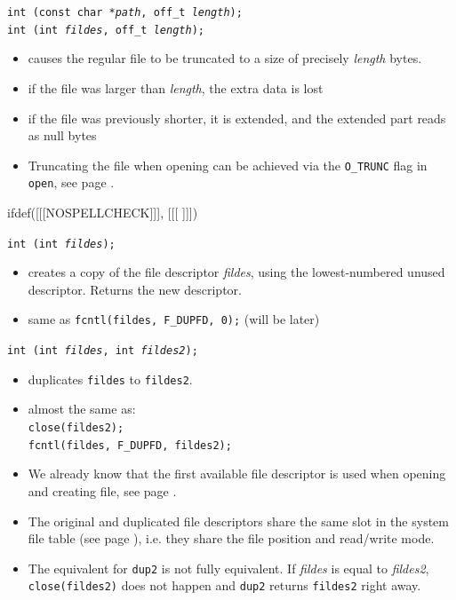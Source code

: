 \begin{slide}
\texttt{int (const char *\emph{path}, off\_t \emph{length});\\
int (int \emph{fildes}, off\_t \emph{length});}
\begin{itemize}
\item causes the regular file to be truncated to a size of precisely
\emph{length} bytes.
\item if the file was larger than \emph{length}, the extra data is lost
\item if the file was previously shorter, it is extended, and the extended part
reads as null bytes
\end{itemize}
\end{slide}

\begin{itemize}
\item Truncating the file when opening  can be achieved via the
\texttt{O\_TRUNC} flag in \texttt{open}, see page \pageref{OPEN}.
\end{itemize}


ifdef([[[NOSPELLCHECK]]], [[[
]]])

\begin{slide}
\texttt{int (int \emph{fildes});}
\begin{itemize}
\item creates a copy of the file descriptor \emph{fildes}, using the
lowest-numbered unused descriptor.  Returns the new descriptor.
\item same as \texttt{fcntl(fildes, F\_DUPFD, 0);} (will be later)
\end{itemize}
\texttt{int (int \emph{fildes}, int \emph{fildes2});}
\begin{itemize}
\item duplicates \texttt{fildes} to \texttt{fildes2}.
\item almost the same as:\\
\texttt{close(fildes2);\\ fcntl(fildes, F\_DUPFD, fildes2);}
\end{itemize}
\end{slide}

\label{DUP_CALL}

\begin{itemize}
\item We already know that the first available file descriptor is used when
opening and creating file, see page \pageref{OPEN}.
\item The original and duplicated file descriptors share the same slot in the
system file table (see page \pageref{OPENFILETABLES}), i.e. they share the file
position and read/write mode.
\item The equivalent for \texttt{dup2} is not fully equivalent.  If
\emph{fildes} is equal to \emph{fildes2}, \texttt{close(fildes2)} does not
happen and \texttt{dup2} returns \texttt{fildes2} right away.
\end{itemize}

